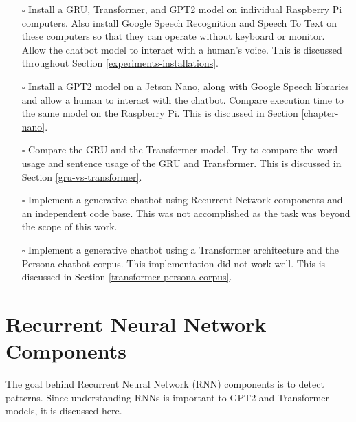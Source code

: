 \begin{itemize}
	\item[\rlap{\raisebox{0.3ex}{\hspace{0.4ex}\tiny \ding{52}}}$\square$] Install a GRU, Transformer, and GPT2 model on individual Raspberry Pi computers. Also install Google Speech Recognition and Speech To Text on these computers so that they can operate without keyboard or monitor. Allow the chatbot model to interact with a human's voice. This is discussed throughout Section \ref{experiments-installations}.
	
	\item[\rlap{\raisebox{0.3ex}{\hspace{0.4ex}\tiny \ding{52}}}$\square$] Install a GPT2 model on a Jetson Nano, along with Google Speech libraries and allow a human to interact with the chatbot. Compare execution time to the same model on the Raspberry Pi. This is discussed in Section \ref{chapter-nano}.
	
	\item[\rlap{\raisebox{0.3ex}{\hspace{0.4ex}\tiny \ding{52}}}$\square$] Compare the GRU and the Transformer model. Try to compare the word usage and sentence usage of the GRU and Transformer. This is discussed in Section \ref{gru-vs-transformer}.
	
	\item[\rlap{\raisebox{0.3ex}{\hspace{0.4ex}\scriptsize \ding{56}}}$\square$] Implement a generative chatbot using Recurrent Network components and an independent code base. This was not accomplished as the task was beyond the scope of this work.
	
	\item[\rlap{\raisebox{0.3ex}{\hspace{0.4ex}\scriptsize \ding{56}}}$\square$] Implement a generative chatbot using a Transformer architecture and the Persona chatbot corpus. This implementation did not work well. This is discussed in Section \ref{transformer-persona-corpus}. %
	
	
\end{itemize}


\section{Recurrent Neural Network Components}

The goal behind Recurrent Neural Network (RNN) components is to detect patterns. Since understanding RNNs is important to GPT2 and Transformer models, it is discussed here. %

